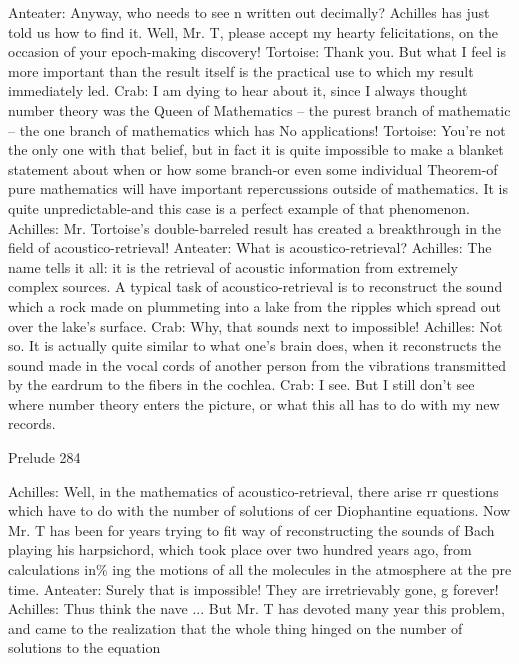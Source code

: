 Anteater: Anyway, who needs to see n written out decimally? Achilles has just told us
   how to find it. Well, Mr. T, please accept my hearty felicitations, on the occasion of
   your epoch-making discovery!
Tortoise: Thank you. But what I feel is more important than the result itself is the
   practical use to which my result immediately led.
Crab: I am dying to hear about it, since I always thought number theory was the Queen of
   Mathematics -- the purest branch of mathematic -- the one branch of mathematics
   which has No applications!
Tortoise: You're not the only one with that belief, but in fact it is quite impossible to
   make a blanket statement about when or how some branch-or even some individual
   Theorem-of pure mathematics will have important repercussions outside of
   mathematics. It is quite unpredictable-and this case is a perfect example of that
   phenomenon.
Achilles: Mr. Tortoise's double-barreled result has created a breakthrough in the field of
   acoustico-retrieval!
Anteater: What is acoustico-retrieval?
Achilles: The name tells it all: it is the retrieval of acoustic information from extremely
   complex sources. A typical task of acoustico-retrieval is to reconstruct the sound
   which a rock made on plummeting into a lake from the ripples which spread out over
   the lake's surface.
Crab: Why, that sounds next to impossible!
Achilles: Not so. It is actually quite similar to what one's brain does, when it reconstructs
   the sound made in the vocal cords of another person from the vibrations transmitted
   by the eardrum to the fibers in the cochlea.
Crab: I see. But I still don't see where number theory enters the picture, or what this all
   has to do with my new records.




Prelude                                                                                  284

Achilles: Well, in the mathematics of acoustico-retrieval, there arise rr questions which
   have to do with the number of solutions of cer Diophantine equations. Now Mr. T has
   been for years trying to fit way of reconstructing the sounds of Bach playing his
   harpsichord, which took place over two hundred years ago, from calculations in\% ing
   the motions of all the molecules in the atmosphere at the pre time.
Anteater: Surely that is impossible! They are irretrievably gone, g forever!
Achilles: Thus think the nave ... But Mr. T has devoted many year this problem, and
   came to the realization that the whole thing hinged on the number of solutions to the
   equation


